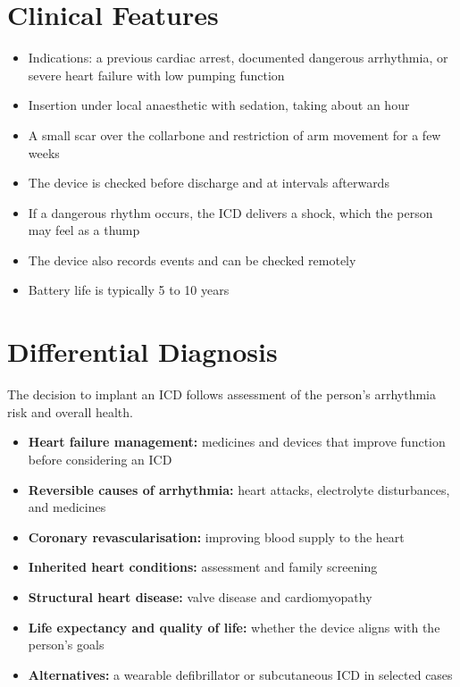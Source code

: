 \section*{Clinical Features}
\begin{itemize}
    \item Indications: a previous cardiac arrest, documented dangerous arrhythmia, or severe heart failure with low pumping function
    \item Insertion under local anaesthetic with sedation, taking about an hour
    \item A small scar over the collarbone and restriction of arm movement for a few weeks
    \item The device is checked before discharge and at intervals afterwards
    \item If a dangerous rhythm occurs, the ICD delivers a shock, which the person may feel as a thump
    \item The device also records events and can be checked remotely
    \item Battery life is typically 5 to 10 years
\end{itemize}

\section*{Differential Diagnosis}
The decision to implant an ICD follows assessment of the person's arrhythmia risk and overall health.
\begin{itemize}
    \item \textbf{Heart failure management:} medicines and devices that improve function before considering an ICD
    \item \textbf{Reversible causes of arrhythmia:} heart attacks, electrolyte disturbances, and medicines
    \item \textbf{Coronary revascularisation:} improving blood supply to the heart
    \item \textbf{Inherited heart conditions:} assessment and family screening
    \item \textbf{Structural heart disease:} valve disease and cardiomyopathy
    \item \textbf{Life expectancy and quality of life:} whether the device aligns with the person's goals
    \item \textbf{Alternatives:} a wearable defibrillator or subcutaneous ICD in selected cases
\end{itemize}

